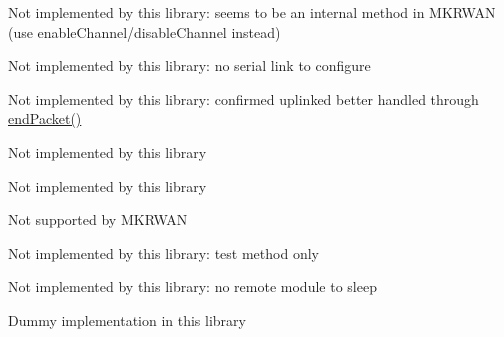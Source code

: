 \begin{DoxyRefList}
\item[Member \mbox{\hyperlink{classSTM32LoRaWAN_a79915834d3c8812cfd80a08d62382686}{S\+T\+M32\+Lo\+Ra\+W\+AN::send\+Mask}} ()]\label{extensions__extensions000046}%
%
 Not implemented by this library\+: seems to be an internal method in M\+K\+R\+W\+AN (use enable\+Channel/disable\+Channel instead)  
\item[Member \mbox{\hyperlink{classSTM32LoRaWAN_a9a54edbb78e6b782204b2d37bed84c96}{S\+T\+M32\+Lo\+Ra\+W\+AN::set\+Baud}} (unsigned long baud)]\label{extensions__extensions000030}%
%
 Not implemented by this library\+: no serial link to configure  
\item[Member \mbox{\hyperlink{classSTM32LoRaWAN_a999c98c64e466aedf9fa2e848e684018}{S\+T\+M32\+Lo\+Ra\+W\+AN::set\+C\+FM}} (bool cfm)]\label{extensions__extensions000025}%
%
 Not implemented by this library\+: confirmed uplinked better handled through \mbox{\hyperlink{classSTM32LoRaWAN_a816dd9c8b223bda9380971c5a1dab377}{end\+Packet()}}  
\item[Member \mbox{\hyperlink{classSTM32LoRaWAN_a29b18acfa3074157c501122b9399d1d1}{S\+T\+M32\+Lo\+Ra\+W\+AN::set\+F\+CD}} (uint16\+\_\+t fcd)]\label{extensions__extensions000015}%
%
 Not implemented by this library  
\item[Member \mbox{\hyperlink{classSTM32LoRaWAN_ab1f8b82511bb880e253f7bdf4e194023}{S\+T\+M32\+Lo\+Ra\+W\+AN::set\+F\+CU}} (uint16\+\_\+t fcu)]\label{extensions__extensions000016}%
%
 Not implemented by this library  
\item[Member \mbox{\hyperlink{classSTM32LoRaWAN_aefa957b4339b2da06b292f917ddfed31}{S\+T\+M32\+Lo\+Ra\+W\+AN::set\+Maintain\+Needed\+Callback}} (std\+::function$<$ void(void)$>$ callback)]\label{extensions__extensions000022}%
%
 Not supported by M\+K\+R\+W\+AN  
\item[Member \mbox{\hyperlink{classSTM32LoRaWAN_a2eb7351c1b7e8ada59ba58e8032c6a83}{S\+T\+M32\+Lo\+Ra\+W\+AN::set\+T\+Conf}} (String params)]\label{extensions__extensions000032}%
%
 Not implemented by this library\+: test method only  
\item[Member \mbox{\hyperlink{classSTM32LoRaWAN_a9d332d013d0a2569bc162568adb1bd04}{S\+T\+M32\+Lo\+Ra\+W\+AN::sleep}} (bool on=true)]\label{extensions__extensions000036}%
%
 Not implemented by this library\+: no remote module to sleep  
\item[Member \mbox{\hyperlink{classSTM32LoRaWAN_ab3dd6a10e89c4e94474b85aa4da0a302}{S\+T\+M32\+Lo\+Ra\+W\+AN::version}} ()]\label{extensions__extensions000023}%
%
 Dummy implementation in this library 
\end{DoxyRefList}